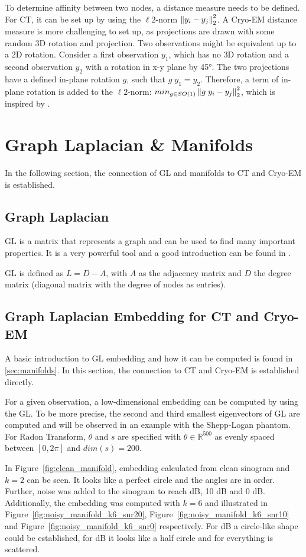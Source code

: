 To determine affinity between two nodes, a distance measure needs to be defined.
For CT, it can be set up by using the $\ell2$-norm $\left\lVert y_i - y_j\right\rVert^2_2$.
A Cryo-EM distance measure is more challenging to set up, as projections are drawn with some random 3D rotation and projection.
Two observations might be equivalent up to a 2D rotation. 
Consider a first observation $y_1$, which has no 3D rotation and 
a second observation $y_2$ with a rotation in x-y plane by 45°.
The two projections have a defined in-plane rotation $g$, such that $g \; y_1 = y_2$.
Therefore, a term of in-plane rotation is added to the $\ell2$-norm: $min_{g \in SO(1)}\left\lVert g \;y_i - y_j\right\rVert^2_2$, 
which is inspired by \cite{multiDiffusionMaps}.


\section{Graph Laplacian \& Manifolds}
In the following section, the connection of GL and manifolds to CT and Cryo-EM is established.

\subsection{Graph Laplacian}
GL is a matrix that represents a graph and can be used to find many important properties.
It is a very powerful tool and a good introduction can be found in \cite{tutorialSpectralClustering, SpectralGraphTheory}. 

GL is defined as $L = D - A$, with $A$ as the adjacency matrix and $D$ the degree matrix (diagonal matrix with the degree of nodes as entries).

\subsection{Graph Laplacian Embedding for CT and Cryo-EM}
A basic introduction to GL embedding and how it can be computed is found in \ref{sec:manifolds}.
In this section, the connection to CT and Cryo-EM is established directly.

For a given observation, a low-dimensional embedding can be computed by using the GL.
To be more precise, the second and third smallest eigenvectors of GL are computed and will be observed in an example 
with the Shepp-Logan phantom.
For Radon Transform, $\theta$ and $s$ are specified with $\theta \in \mathbb{R}^{500}$ as evenly spaced
between $[0, 2 \pi]$ and $dim(s) = 200$. 

In Figure~\ref{fig:clean_manifold}, embedding calculated from clean sinogram and $k=2$ can be seen.
It looks like a perfect circle and the angles are in order. 
Further, noise was added to the sinogram to reach  dB, 10 dB and 0 dB. 
Additionally, the embedding was computed with $k=6$ and illustrated in Figure~\ref{fig:noisy_manifold_k6_snr20},
Figure~\ref{fig:noisy_manifold_k6_snr10} and Figure~\ref{fig:noisy_manifold_k6_snr0} respectively.
For  dB a circle-like shape could be established, for  dB it looks like a half circle and for \snry
everything is scattered. 

